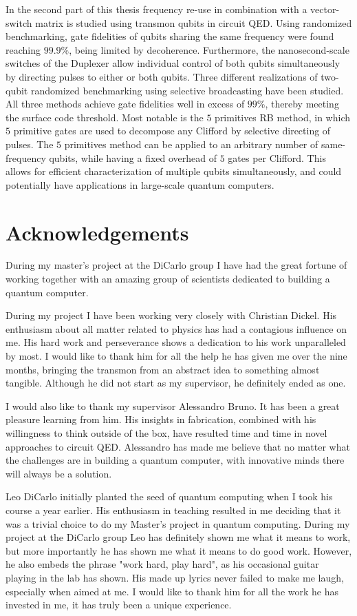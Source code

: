 \documentclass[12pt]{report}
\begin{document}
In the second part of this thesis frequency re-use in combination with a vector-switch matrix is studied using transmon qubits in circuit QED. Using randomized benchmarking, gate fidelities of qubits sharing the same frequency were found reaching $99.9\%$, being limited by decoherence. Furthermore, the nanosecond-scale switches of the Duplexer allow individual control of both qubits simultaneously by directing pulses to either or both qubits. Three different realizations of two-qubit randomized benchmarking using selective broadcasting have been studied. All three methods achieve gate fidelities well in excess of $99\%$, thereby meeting the surface code threshold. Most notable is the $5$ primitives RB method, in which $5$ primitive gates are used to decompose any Clifford by selective directing of pulses. The $5$ primitives method can be applied to an arbitrary number of same-frequency qubits, while having a fixed overhead of $5$ gates per Clifford. This allows for efficient characterization of multiple qubits simultaneously, and could potentially have applications in large-scale quantum computers.

\chapter*{Acknowledgements}

During my master's project at the DiCarlo group I have had the great fortune of working together with an amazing group of scientists dedicated to building a quantum computer.

During my project I have been working very closely with Christian Dickel. His enthusiasm about all matter related to physics has had a contagious influence on me. His hard work and perseverance shows a dedication to his work unparalleled by most. I would like to thank him for all the help he has given me over the nine months, bringing the transmon from an abstract idea to something almost tangible. Although he did not start as my supervisor, he definitely ended as one.

I would also like to thank my supervisor Alessandro Bruno. It has been a great pleasure learning from him. His insights in fabrication, combined with his willingness to think outside of the box, have resulted time and time in novel approaches to circuit QED. Alessandro has made me believe that no matter what the challenges are in building a quantum computer, with innovative minds there will always be a solution.

Leo DiCarlo initially planted the seed of quantum computing when I took his course a year earlier. His enthusiasm in teaching resulted in me deciding that it was a trivial choice to do my Master's project in quantum computing. During my project at the DiCarlo group Leo has definitely shown me what it means to work, but more importantly he has shown me what it means to do good work. However, he also embeds the phrase "work hard, play hard", as his occasional guitar playing in the lab has shown. His made up lyrics never failed to make me laugh, especially when aimed at me. I would like to thank him for all the work he has invested in me, it has truly been a unique experience.
\end{document}
